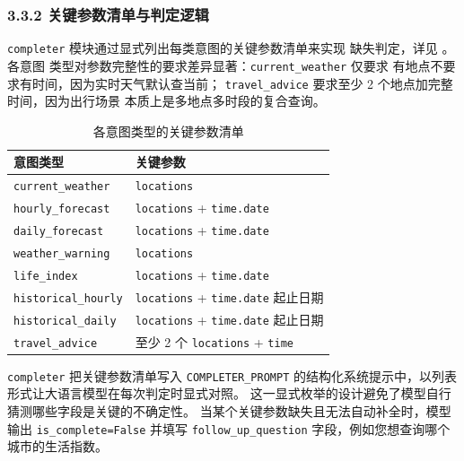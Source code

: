 \subsubsection*{3.3.2 \quad 关键参数清单与判定逻辑}

\texttt{completer} 模块通过显式列出每类意图的关键参数清单来实现
缺失判定，详见 。各意图
类型对参数完整性的要求差异显著：\texttt{current\_\bk{}weather} 仅要求
有地点不要求有时间，因为实时天气默认查当前；
\texttt{travel\_\bk{}advice} 要求至少 2 个地点加完整时间，因为出行场景
本质上是多地点多时段的复合查询。

\begin{table}[!ht]
    \centering
    \caption{各意图类型的关键参数清单}
    \label{tab:completion-required-params}
    \song\fontsize{9pt}{12pt}\selectfont
    \renewcommand{\arraystretch}{0.95}
    \begin{tabular}{ll}
        \toprule
        意图类型 & 关键参数 \\
        \midrule
        \texttt{current\_\bk{}weather} & \texttt{locations} \\
        \texttt{hourly\_\bk{}forecast} & \texttt{locations} + \texttt{time.\bk{}date} \\
        \texttt{daily\_\bk{}forecast} & \texttt{locations} + \texttt{time.\bk{}date} \\
        \texttt{weather\_\bk{}warning} & \texttt{locations} \\
        \texttt{life\_\bk{}index} & \texttt{locations} + \texttt{time.\bk{}date} \\
        \texttt{historical\_\bk{}hourly} & \texttt{locations} + \texttt{time.\bk{}date} 起止日期 \\
        \texttt{historical\_\bk{}daily} & \texttt{locations} + \texttt{time.\bk{}date} 起止日期 \\
        \texttt{travel\_\bk{}advice} & 至少 2 个 \texttt{locations} + \texttt{time} \\
        \bottomrule
    \end{tabular}
\end{table}

\texttt{completer} 把关键参数清单写入 \texttt{COMPLETER\_\bk{}PROMPT}
的结构化系统提示中，以列表形式让大语言模型在每次判定时显式对照。
这一显式枚举的设计避免了模型自行猜测哪些字段是关键的不确定性。
当某个关键参数缺失且无法自动补全时，模型输出
\texttt{is\_\bk{}complete=\bk{}False} 并填写 \texttt{follow\_\bk{}up\_\bk{}question}
字段，例如您想查询哪个城市的生活指数。

